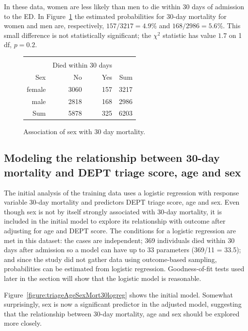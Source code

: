 In these data, women are less likely than men to die within 30 days of admission to the ED. In Figure~\ref{figure:sexMort30Table} the estimated probabilities for 30-day mortality for women and men are, respectively, $157/3217 = 4.9\%$ and $168/2986 = 5.6\%$.  This small difference is not statistically significant; the $\chi^2$ statistic has value $1.7$ on 1 df, $p = 0.2$.

\begin{figure}[ht]
\centering
\begin{tabular}{rrrr}
  \hline \\
    & \multicolumn{2}{c}{Died within 30 days} & \\
 Sex & No & Yes & Sum \\
  \hline
female & 3060 & 157 & 3217 \\
  male & 2818 & 168 & 2986 \\
  Sum & 5878 & 325 & 6203 \\
   \hline
\end{tabular}
\caption{Association of sex with
       30 day mortality.}
\label{figure:sexMort30Table}
\end{figure}


\subsection{Modeling the relationship between 30-day mortality and DEPT triage score, age and sex}
\label{section:triageModelDEPTAgeSex}

The initial analysis of the training data uses a logistic regression with response variable 30-day mortality and predictors DEPT triage score, age and sex.  Even though sex is not by itself strongly associated with 30-day mortality, it is included in the initial model to explore its relationship with outcome after adjusting for age and DEPT score.   The conditions for a logistic regression are met in this dataset: the cases are independent; 369 individuals died within 30 days after admission so a model can have up to 33 parameters (369/11 = 33.5); and since the study did not gather data using outcome-based sampling, probabilities can be estimated from logistic regression.  Goodness-of-fit tests used later in the section will show that the logistic model is reasonable.

Figure~\ref{figure:triageAgeSexMort30logreg} shows the initial model.  Somewhat surprisingly, sex is now a significant predictor in the adjusted model, suggesting that the relationship between 30-day mortality, age and sex should be explored more closely.

